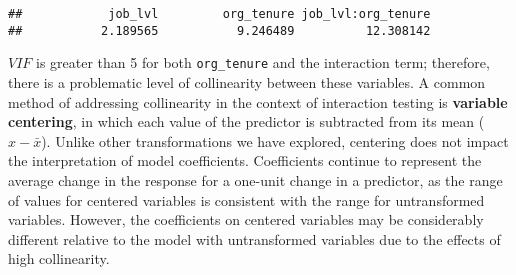 \documentclass[
]{book}
\begin{document}
\begin{verbatim}
##            job_lvl         org_tenure job_lvl:org_tenure 
##           2.189565           9.246489          12.308142
\end{verbatim}

\(VIF\) is greater than 5 for both \texttt{org\_tenure} and the interaction term; therefore, there is a problematic level of collinearity between these variables.
A common method of addressing collinearity in the context of interaction testing is \textbf{variable centering}, in which each value of the predictor is subtracted from its mean (\(x - \bar{x}\)). Unlike other transformations we have explored, centering does not impact the interpretation of model coefficients. Coefficients continue to represent the average change in the response for a one-unit change in a predictor, as the range of values for centered variables is consistent with the range for untransformed variables. However, the coefficients on centered variables may be considerably different relative to the model with untransformed variables due to the effects of high collinearity.

\providecommand{\docline}[3]{\noalign{\global\setlength{\arrayrulewidth}{#1}}\arrayrulecolor[HTML]{#2}\cline{#3}}

\setlength{\tabcolsep}{2pt}

\renewcommand*{\arraystretch}{1.5}
\end{document}
